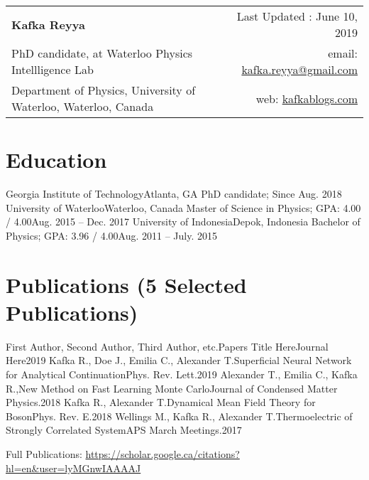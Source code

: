 \documentclass[letterpaper,11pt]{article}
\begin{document}
\begin{tabular*}{\textwidth}{l@{\extracolsep{\fill}}r}
  \textbf{\Large Kafka Reyya} & Last Updated : June 10, 2019\\
  {PhD candidate, at Waterloo Physics Intellligence Lab} & email: \href{mailto:kafka.reyya@gmail.com}{kafka.reyya@gmail.com} \\
  {Department of Physics, University of Waterloo, Waterloo, Canada} & web: \href{https://www.kafkablogs.com}{kafkablogs.com} \\
\end{tabular*}


\section{Education}
\resumeSubHeadingListStart

     \resumeSubheading
      {Georgia Institute of Technology}{Atlanta, GA}
      {PhD candidate; }{Since Aug. 2018}
    \resumeSubheading
      {University of Waterloo}{Waterloo, Canada}
      {Master of Science in Physics;  GPA: 4.00 / 4.00}{Aug. 2015 -- Dec. 2017}
    \resumeSubheading
      {University of Indonesia}{Depok, Indonesia}
      {Bachelor of Physics;  GPA: 3.96 / 4.00}{Aug. 2011 -- July. 2015}
      
\resumeSubHeadingListEnd
  
\section{Publications (5 Selected Publications)}
\resumeItemListStart
  
    \publicationItem
    		{First Author, Second Author, Third Author, etc.}{Papers Title Here}{Journal Here}{2019}
    \publicationItem
    		{Kafka R., Doe J., Emilia C., Alexander T.}{Superficial Neural Network for Analytical Continuation}{Phys. Rev. Lett.}{2019}
    \publicationItem
    		{Alexander T., Emilia C., Kafka R.,}{New Method on Fast Learning Monte Carlo}{Journal of Condensed Matter Physics.}{2018}
    \publicationItem
    		{Kafka R., Alexander T.}{Dynamical Mean Field Theory for Boson}{Phys. Rev. E.}{2018}
    \publicationItem
    		{Wellings M., Kafka R., Alexander T.}{Thermoelectric of Strongly Correlated System}{APS March Meetings.}{2017}    		    		    		
\resumeItemListEnd

Full Publications: \href{https://scholar.google.ca/citations?hl=en&user=lyMGnwIAAAAJ}{https://scholar.google.ca/citations?hl=en\&user=lyMGnwIAAAAJ} 
\end{document}

